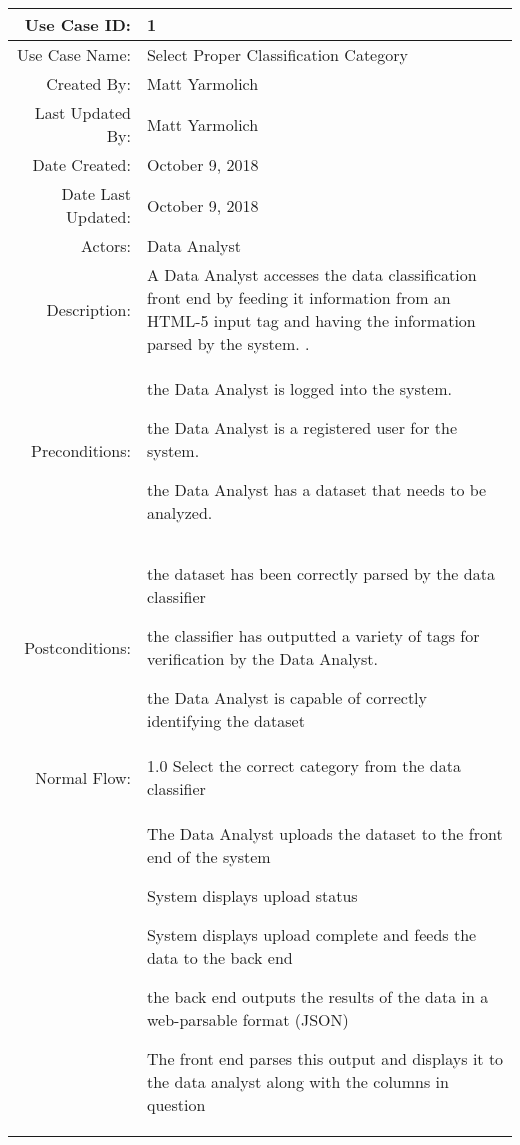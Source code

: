 \documentclass[12pt,oneside,letterpaper]{article}
\newenvironment{packed_enumerate}{ %
\vspace{-7mm}
\begin{enumerate}
  \setlength{\itemsep}{0pt}
  \setlength{\parskip}{0pt}
  \setlength{\parsep}{0pt}
}{\end{enumerate}
\vspace{-8mm}}
\begin{document}
\begin{longtable}{|r|p{3.8in}|}
\hline
Use Case ID:&1\\
\hline
Use Case Name:&Select Proper Classification Category\\
\hline
Created By:&Matt Yarmolich\\
\hline
Last Updated By:&Matt Yarmolich\\
\hline
Date Created:&October 9, 2018\\
\hline
Date Last Updated:&October 9, 2018\\
\hline
Actors:&Data Analyst\\
\hline
Description:&A Data Analyst accesses the data classification \gls{front end} by feeding it information from an HTML-5 input tag and having the information parsed by the system. .\\
\hline
Preconditions:&
\begin{packed_enumerate}
\item the Data Analyst is logged into the system.
\item the Data Analyst is a registered user for the system.
\item the Data Analyst has a dataset that needs to be analyzed.
\end{packed_enumerate}\\
\hline
Postconditions:&
\begin{packed_enumerate}
\item the dataset has been correctly parsed by the data classifier
\item the classifier has outputted a variety of tags for verification by the Data Analyst. 
\item the Data Analyst is capable of correctly identifying the dataset
\end{packed_enumerate}\\
\hline
Normal Flow:&1.0 Select the correct category from the data classifier\\
&  %
\begin{packed_enumerate}
\item The Data Analyst uploads the dataset to the \gls{front end} of the system
\item System displays upload status
\item System displays upload complete and feeds the data to the \gls{back end}
\item the \gls{back end} outputs the results of the data in a web-parsable format (JSON)
\item The \gls{front end} parses this output and displays it to the data analyst along with the columns in question

\end{packed_enumerate}
\end{longtable}
\end{document}
